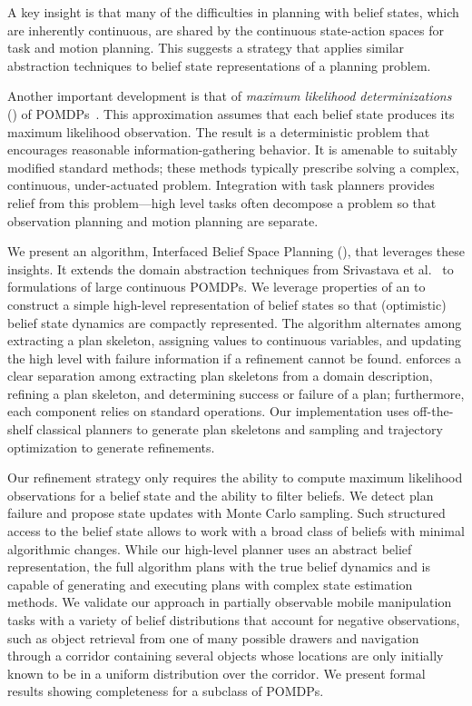 A key insight is that many of the difficulties in planning with belief
states, which are inherently continuous, are shared by the continuous
state-action spaces for task and motion planning. This suggests a
strategy that applies similar abstraction techniques to belief state
representations of a planning problem.

Another important development is that of \emph{maximum likelihood
  determinizations} (\mld) of POMDPs~\cite{platt2010belief}. This
approximation assumes that each belief state produces its maximum
likelihood observation. The result is a deterministic problem that
encourages reasonable information-gathering behavior. It is amenable
to suitably modified standard methods; these methods typically
prescribe solving a complex, continuous, under-actuated
problem. Integration with task planners provides relief from this
problem---high level tasks often decompose a problem so that
observation planning and motion planning are separate.

We present an algorithm, Interfaced Belief Space Planning (\ibsp),
that leverages these insights. It extends the domain abstraction
techniques from Srivastava et al.~\cite{srivastava2014combined} to
\mld{} formulations of large continuous POMDPs. We leverage properties
of an \mld{} to construct a simple high-level representation of belief
states so that (optimistic) belief state dynamics are compactly
represented. The algorithm alternates among extracting a plan
skeleton, assigning values to continuous variables, and updating the
high level with failure information if a refinement cannot be found.
\ibsp{} enforces a clear separation among extracting plan skeletons
from a domain description, refining a plan skeleton, and determining
success or failure of a plan; furthermore, each component relies on
standard operations. Our implementation uses off-the-shelf classical
planners to generate plan skeletons and sampling and trajectory
optimization to generate refinements.

Our refinement strategy only requires the ability to compute maximum
likelihood observations for a belief state and the ability to filter
beliefs. We detect plan failure and propose state updates with Monte Carlo
sampling. Such structured access to the belief state allows \ibsp{} to work with a broad class
of beliefs with minimal algorithmic changes. While our high-level
planner uses an abstract belief representation, the full algorithm
plans with the true belief dynamics and is capable of generating and executing plans
with complex state estimation methods. We validate our approach in
partially observable mobile manipulation tasks with a variety of
belief distributions that account for negative observations, such as object retrieval from
one of many possible drawers and navigation through a corridor containing several objects
whose locations are only initially known to be in a uniform distribution over the corridor. We
present formal results showing completeness for a subclass of POMDPs.

